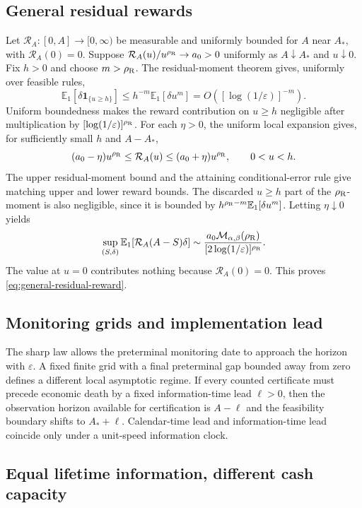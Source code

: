 \documentclass[11pt]{article}
\numberwithin{equation}{section}
\theoremstyle{plain}
\theoremstyle{definition}
\theoremstyle{remark}
\newcommand{\Eone}{\mathbb E_1}
\begin{document}
\subsection{General residual rewards}\label{app:general-residual-rewards}

Let $\mathcal R_A:[0,A]\to[0,\infty)$ be measurable and uniformly bounded
for $A$ near $A_*$, with $\mathcal R_A(0)=0$. Suppose
$\mathcal R_A(u)/u^{\rho_{\rm R}}\to a_0>0$ uniformly as $A\downarrow A_*$
and $u\downarrow0$. Fix $h>0$ and choose $m>\rho_{\rm R}$. The
residual-moment theorem gives, uniformly over feasible rules,
\[
\mathbb E_1[\delta\mathbf1_{\{u\ge h\}}]
\le h^{-m}\mathbb E_1[\delta u^m]
=O([\log(1/\varepsilon)]^{-m}).
\]
Uniform boundedness makes the reward contribution on $u\ge h$ negligible
after multiplication by $[\log(1/\varepsilon)]^{\rho_{\rm R}}$. For each
$\eta>0$, the uniform local expansion gives, for sufficiently small $h$
and $A-A_*$,
\[
(a_0-\eta)u^{\rho_{\rm R}}\le\mathcal R_A(u)
\le(a_0+\eta)u^{\rho_{\rm R}},\qquad 0<u<h.
\]
The upper residual-moment bound and the attaining conditional-error rule
give matching upper and lower reward bounds. The discarded $u\ge h$ part
of the $\rho_{\rm R}$-moment is also negligible, since it is bounded by
$h^{\rho_{\rm R}-m}\mathbb E_1[\delta u^m]$. Letting $\eta\downarrow0$ yields
\[
\sup_{(S,\delta)}\Eone[\mathcal R_A(A-S)\delta]
\sim\frac{a_0\mathcal M_{\alpha,\beta}(\rho_{\rm R})}
{[2\log(1/\varepsilon)]^{\rho_{\rm R}}}.
\]
The value at $u=0$ contributes nothing because $\mathcal R_A(0)=0$.
This proves \eqref{eq:general-residual-reward}.

\subsection{Monitoring grids and implementation lead}\label{app:monitoring-scope}

The sharp law allows the preterminal monitoring date to approach the horizon with $\varepsilon$. A fixed finite grid with a final preterminal gap bounded away from zero defines a different local asymptotic regime. If every counted certificate must precede economic death by a fixed information-time lead $\ell>0$, then the observation horizon available for certification is $A-\ell$ and the feasibility boundary shifts to $A_*+\ell$. Calendar-time lead and information-time lead coincide only under a unit-speed information clock.

\subsection{Equal lifetime information, different cash capacity}\label{app:cash-capacity-counterexample}
\end{document}
